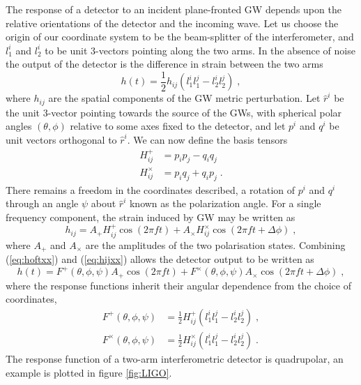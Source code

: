 The response of a detector to an incident plane-fronted GW depends upon the relative orientations of the detector and the incoming wave. Let us choose the origin of our coordinate system to be the beam-splitter of the interferometer, and $l_{1}^{i}$ and $l_{2}^{i}$ to be unit 3-vectors pointing along the two arms. In the absence of noise the output of the detector is the difference in strain between the two arms \citep{Thorne1987} 
\begin{equation}\label{eq:hoftxx}
h(t)=\frac{1}{2}h_{ij}\left( l_{1}^{i}l_{1}^{j}-l_{2}^{i}l_{2}^{j} \right)\; ,
\end{equation}
where $h_{ij}$ are the spatial components of the GW metric perturbation. Let $\hat{r}^{i}$ be the unit 3-vector pointing towards the source of the GWs, with spherical polar angles $(\theta,\phi)$ relative to some axes fixed to the detector, and let $p^{i}$ and $q^{i}$ be unit vectors orthogonal to $\hat{r}^{i}$. We can now define the basis tensors
\begin{eqnarray}
H^{+}_{ij}&=p_{i}p_{j}-q_{i}q_{j} \nonumber \\
H^{\times}_{ij}&=p_{i}q_{j}+q_{i}p_{j} \; .
\end{eqnarray}
There remains a freedom in the coordinates described, a rotation of $p^{i}$ and $q^{i}$ through an angle $\psi$ about $\hat{r}^{i}$ known as the polarization angle. For a single frequency component, the strain induced by GW may be written as
\begin{equation}\label{eq:hijxx}
h_{ij}=A_{+}H^{+}_{ij}\cos\left(2\pi ft\right)+A_{\times}H^{\times}_{ij}\cos\left(2\pi ft+\Delta \phi\right) \; ,
\end{equation}
where $A_{+}$ and $A_{\times}$ are the amplitudes of the two polarisation states. Combining (\ref{eq:hoftxx}) and (\ref{eq:hijxx}) allows the detector output to be written as
\begin{equation}
h(t)=F^{+}(\theta,\phi,\psi)A_{+}\cos\left(2\pi ft\right)+F^{\times}(\theta,\phi,\psi)A_{\times}\cos\left(2\pi f t + \Delta\phi \right)\; ,
\end{equation}
where the response functions inherit their angular dependence from the choice of coordinates,
\begin{eqnarray}\label{eq:responsefuncs}
F^{+}(\theta,\phi,\psi)&=\frac{1}{2}H^{+}_{ij}\left(l_{1}^{i}l_{1}^{j}-l_{2}^{i}l_{2}^{j}\right) \; , \\
F^{\times}(\theta,\phi,\psi)&=\frac{1}{2}H^{\times}_{ij}\left(l_{1}^{i}l_{1}^{j}-l_{2}^{i}l_{2}^{j}\right) \; . 
\end{eqnarray}
The response function of a two-arm interferometric detector is quadrupolar, an example is plotted in figure \ref{fig:LIGO}.

